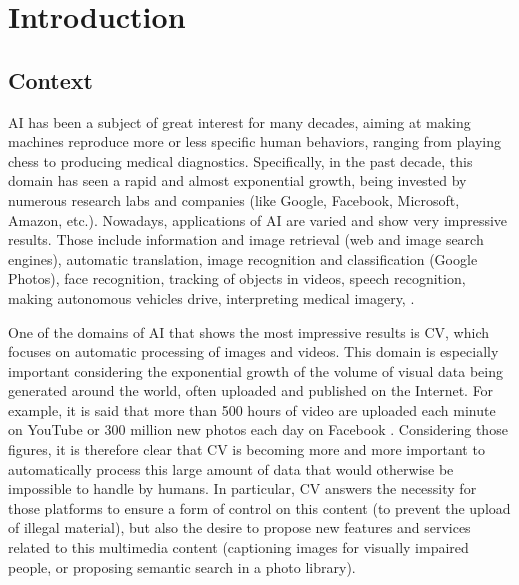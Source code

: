 \chapter{Introduction}
\label{chapter:introduction}

{}


\section{Context}

\acf{AI} has been a subject of great interest for many decades, aiming at making machines reproduce more or less specific human behaviors, ranging from playing chess to producing medical diagnostics. Specifically, in the past decade, this domain has seen a rapid and almost exponential growth, being invested by numerous research labs and companies (like Google, Facebook, Microsoft, Amazon, etc.). Nowadays, applications of \ac{AI} are varied and show very impressive results. Those include information and image retrieval (web and image search engines), automatic translation, image recognition and classification (\eg Google Photos), face recognition, tracking of objects in videos, speech recognition, making autonomous vehicles drive, interpreting medical imagery, \etc.

One of the domains of \ac{AI} that shows the most impressive results is \acf{CV}, which focuses on automatic processing of images and videos. This domain is especially important considering the exponential growth of the volume of visual data being generated around the world, often uploaded and published on the Internet. For example, it is said that more than 500 hours of video are uploaded each minute on YouTube \citep{tubefilter} or 300 million new photos each day on Facebook \citep{zephoria}. Considering those figures, it is therefore clear that \ac{CV} is becoming more and more important to automatically process this large amount of data that would otherwise be impossible to handle by humans. In particular, \ac{CV} answers the necessity for those platforms to ensure a form of control on this content (\eg to prevent the upload of illegal material), but also the desire to propose new features and services related to this multimedia content (\eg captioning images for visually impaired people, or proposing semantic search in a photo library).

